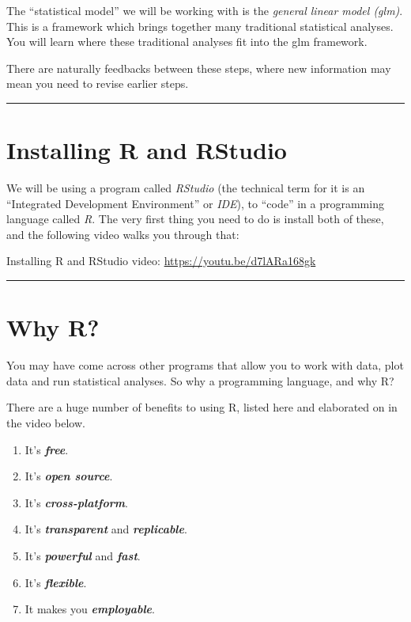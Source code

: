 \documentclass[
]{book}
\providecommand{\tightlist}{%
  \setlength{\itemsep}{0pt}\setlength{\parskip}{0pt}}
\begin{document}
The ``statistical model'' we will be working with is the
\emph{general linear model (glm)}. This is a framework which brings together
many traditional statistical analyses. You will learn where these traditional
analyses fit into the glm framework.

There are naturally feedbacks between these steps, where new information may
mean you need to revise earlier steps.\\
\hspace*{0.333em}

\begin{center}\rule{0.5\linewidth}{0.5pt}\end{center}

\hypertarget{installing-r-and-rstudio}{%
\section{Installing R and RStudio}\label{installing-r-and-rstudio}}

We will be using a program called \emph{RStudio} (the technical term for it is an
``Integrated Development Environment'' or \emph{IDE}), to ``code'' in a programming
language called \emph{R}. The very first thing you need to do is install both of
these, and the following video walks you through that:

Installing R and RStudio video: \url{https://youtu.be/d7lARa168gk}
~

\begin{center}\rule{0.5\linewidth}{0.5pt}\end{center}

\hypertarget{why-r}{%
\section{Why R?}\label{why-r}}

You may have come across other programs that allow you to work with data,
plot data and run statistical analyses. So why a programming language, and why
R?

There are a huge number of benefits to using R, listed here and elaborated on in
the video below.

\begin{enumerate}
\def\labelenumi{\arabic{enumi}.}
\tightlist
\item
  It's \textbf{\emph{free}}.
\item
  It's \textbf{\emph{open source}}.
\item
  It's \textbf{\emph{cross-platform}}.
\item
  It's \textbf{\emph{transparent}} and \textbf{\emph{replicable}}.
\item
  It's \textbf{\emph{powerful}} and \textbf{\emph{fast}}.
\item
  It's \textbf{\emph{flexible}}.
\item
  It makes you \textbf{\emph{employable}}.
\end{enumerate}
\end{document}
